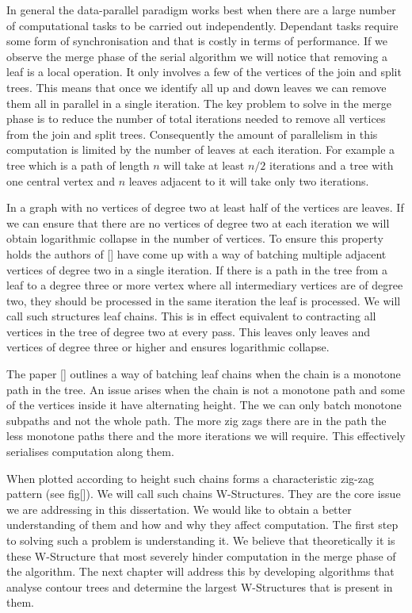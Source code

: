 In general the data-parallel paradigm works best when there are a large number of computational tasks to be carried out independently. Dependant tasks require some form of synchronisation and that is costly in terms of performance. If we observe the merge phase of the serial algorithm we will notice that removing a leaf is a local operation. It only involves a few of the vertices of the join and split trees. This means that once we identify all up and down leaves we can remove them all in parallel in a single iteration. The key problem to solve in the merge phase is to reduce the number of total iterations needed to remove all vertices from the join and split trees. Consequently the amount of parallelism in this computation is limited by the number of leaves at each iteration. For example a tree which is a path of length $n$ will take at least $n/2$ iterations and a tree with one central vertex and $n$ leaves adjacent to it will take only two iterations.

In a graph with no vertices of degree two at least half of the vertices are leaves. If we can ensure that there are no vertices of degree two at each iteration we will obtain logarithmic collapse in the number of vertices. To ensure this property holds the authors of [] have come up with a way of batching multiple adjacent vertices of degree two in a single iteration. If there is a path in the tree from a leaf to a degree three or more vertex where all intermediary vertices are of degree two, they should be processed in the same iteration the leaf is processed. We will call such structures leaf chains. This is in effect equivalent to contracting all vertices in the tree of degree two at every pass. This leaves only leaves and vertices of degree three or higher and ensures logarithmic collapse.

The paper [] outlines a way of batching leaf chains when the chain is a monotone path in the tree. An issue arises when the chain is not a monotone path and some of the vertices inside it have alternating height. The we can only batch monotone subpaths and not the whole path. The more zig zags there are in the path the less monotone paths there and the more iterations we will require. This effectively serialises computation along them.

When plotted according to height such chains forms a characteristic zig-zag pattern (see fig[]). We will call such chains W-Structures. They are the core issue we are addressing in this dissertation. We would like to obtain a better understanding of them and how and why they affect computation. The first step to solving such a problem is understanding it. We believe that theoretically it is these W-Structure that most severely hinder computation in the merge phase of the algorithm. The next chapter will address this by developing algorithms that analyse contour trees and determine the largest W-Structures that is present in them. 


